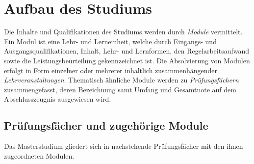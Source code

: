 %
\newcommand*\Deutsch[1][B2]{%
  Für einen erfolgreichen Studienfortgang werden Deutschkenntnisse
  nach Referenzniveau #1 des Gemeinsamen Europäischen Referenzrahmens
  für Sprachen empfohlen.%
}%
\newcommand*\Englisch[1][]{}%

%


\section{Aufbau des Studiums}\label{sec:AS}

Die Inhalte und Qualifikationen des Studiums werden durch
\emph{Module} vermittelt. Ein Modul ist eine Lehr- und Lerneinheit,
welche durch Eingangs- und Ausgangsqualifikationen, Inhalt, Lehr- und
Lernformen, den Regelarbeitsaufwand sowie die Leistungsbeurteilung
gekennzeichnet ist. Die Absolvierung von Modulen erfolgt in Form
einzelner oder mehrerer inhaltlich zusammenhängender
\emph{Lehrveranstaltungen}.  Thematisch ähnliche Module werden zu
\emph{Prüfungsfächern} zusammengefasst, deren Bezeichnung samt 
Umfang und Gesamtnote auf dem Abschlusszeugnis ausgewiesen wird.

\subsection*{Prüfungsfächer und zugehörige Module}

Das Masterstudium \emph{} gliedert sich in 
nachstehende Prüfungsfächer mit den ihnen zugeordneten Modulen.


